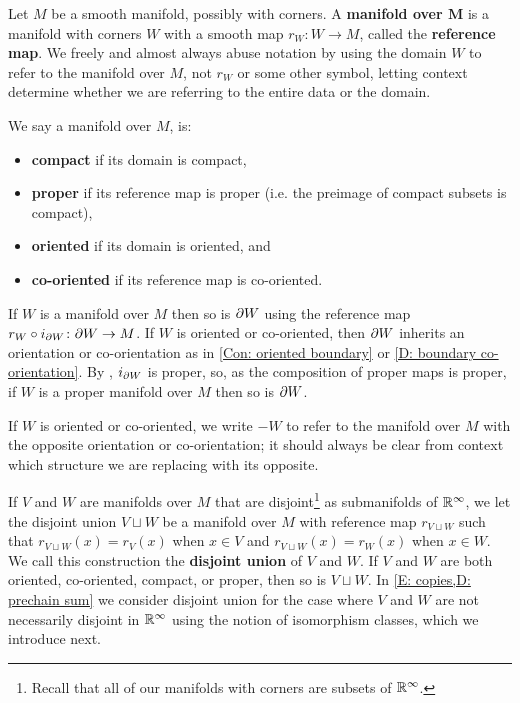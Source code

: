 \begin{definition}\label{V: maps are co-oriented}
	Let $M$ be a smooth manifold, possibly with corners.
	A \textbf{manifold over $\mathbf{M}$} is a manifold with corners $W$ with a smooth map $r_W \colon W \to M$,
	called the \textbf{reference map}.
	We freely and almost always abuse notation
	by using the domain $W$ to refer to the manifold over $M$, not $r_W$ or some other symbol, letting
	context determine whether we are referring to the entire data or the domain.

	We say a manifold over $M$, is:
	\begin{itemize}
		\item \textbf{compact} if its domain is compact,
		\item \textbf{proper} if its reference map is proper (i.e. the preimage of compact subsets is compact),
		\item \textbf{oriented} if its domain is oriented, and
		\item \textbf{co-oriented} if its reference map is co-oriented.
	\end{itemize}
	If $W$ is a manifold over $M$ then so is $\partial W$ using the reference map $r_W \circ i_{\partial W} \colon \partial W \to M$.
	If $W$ is oriented or co-oriented, then $\partial W$ inherits an orientation or co-orientation as in \cref{Con: oriented boundary} or \cref{D: boundary co-orientation}.
	By \cite[Lemma 2.8]{Joy12}, $i_{\partial W}$ is proper, so, as the composition of proper maps is proper, if $W$ is a proper manifold over $M$ then so is $\partial W$.

	If $W$ is oriented or co-oriented, we write $-W$ to refer to the manifold over $M$ with the opposite orientation or co-orientation; it should always be clear from context which structure we are replacing with its opposite.

	If $V$ and $W$ are manifolds over $M$ that are disjoint\footnote{Recall that all of our manifolds with corners are subsets of $\mathbb{R}^\infty$.} as submanifolds of $\mathbb{R}^\infty$, we let the disjoint union $V \sqcup W$ be a manifold over $M$ with reference map $r_{V \sqcup W}$ such that $r_{V \sqcup W}(x) = r_V(x)$ when $x \in V$ and $r_{V \sqcup W}(x) = r_W(x)$ when $x \in W$.
	We call this construction the \textbf{disjoint union} of $V$ and $W$.
	If $V$ and $W$ are both oriented, co-oriented, compact, or proper, then so is $V \sqcup W$.
	In \cref{E: copies,D: prechain sum} we consider disjoint union for the case where $V$ and $W$ are not necessarily disjoint in $\mathbb{R}^\infty$ using the notion of isomorphism classes, which we introduce next.
\end{definition}

